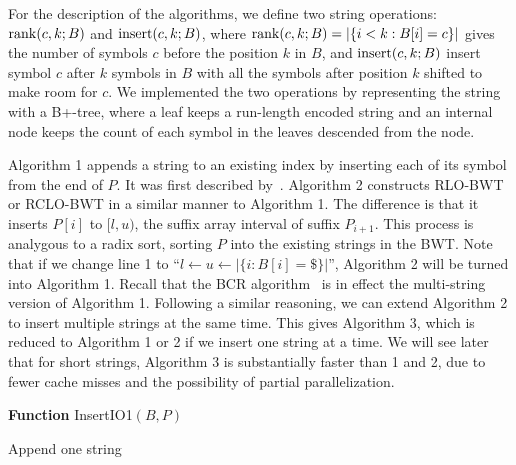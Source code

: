 \documentclass{bioinfo-pre}
\begin{document}
\begin{methods}
For the description of the algorithms, we define two string operations: ${\rm
rank}(c,k;B)$ and ${\rm insert}(c,k;B)$, where ${\rm
rank}(c,k;B)=|\{i<k:B[i]=c\}|$ gives the number of symbols $c$ before the
position $k$ in $B$, and ${\rm insert}(c,k;B)$ insert symbol $c$ after $k$
symbols in $B$ with all the symbols after position $k$ shifted to make room for
$c$. We implemented the two operations by representing the string with a
B+-tree, where a leaf keeps a run-length encoded string and an internal node
keeps the count of each symbol in the leaves descended from the node.

Algorithm 1 appends a string to an existing index by inserting each of its
symbol from the end of $P$. It was first described
by~\citet{DBLP:conf/cpm/ChanHL04}. Algorithm 2 constructs RLO-BWT or RCLO-BWT
in a similar manner to Algorithm 1. The difference is that it inserts $P[i]$ to
$[l,u)$, the suffix array interval of suffix $P_{i+1}$. This process is
analygous to a radix sort, sorting $P$ into the existing strings in the BWT.
Note that if we change line 1 to ``\mbox{$l\gets u\gets|\{i:B[i]=\$\}|$}'',
Algorithm 2 will be turned into Algorithm 1. Recall that the BCR
algorithm~\citep{DBLP:journals/tcs/BauerCR13} is in effect the multi-string
version of Algorithm 1. Following a similar reasoning, we can extend Algorithm
2 to insert multiple strings at the same time. This gives Algorithm 3, which is
reduced to Algorithm 1 or 2 if we insert one string at a time. We will see
later that for short strings, Algorithm 3 is substantially faster than
1 and 2, due to fewer cache misses and the possibility of partial parallelization.

\begin{algorithm}[ht]
\DontPrintSemicolon
\footnotesize
{}
\BlankLine
\textbf{Function} {\sc InsertIO1}$(B,P)$
\caption{Append one string}
\end{algorithm}


\end{methods}
\end{document}
